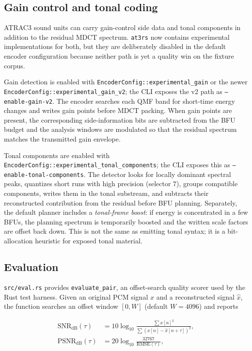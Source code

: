 \documentclass[11pt]{article}
\begin{document}
\subsection{Gain control and tonal coding}

ATRAC3 sound units can carry gain-control side data and tonal components in
addition to the residual MDCT spectrum. \texttt{at3rs} now contains
experimental implementations for both, but they are deliberately disabled in
the default encoder configuration because neither path is yet a quality win
on the fixture corpus.

Gain detection is enabled with \texttt{EncoderConfig::experimental\_gain} or the
newer \texttt{EncoderConfig::experimental\_gain\_v2}; the CLI exposes the v2
path as \texttt{--enable-gain-v2}. The encoder searches each QMF
band for short-time energy changes and writes gain points before MDCT
packing. When gain points are present, the corresponding side-information
bits are subtracted from the BFU budget and the analysis windows are modulated
so that the residual spectrum matches the transmitted gain envelope.

Tonal components are enabled with
\texttt{EncoderConfig::experimental\_tonal\_components}; the CLI exposes this
as \texttt{--enable-tonal-components}. The detector looks for
locally dominant spectral peaks, quantizes short runs with high precision
(selector \(7\)), groups compatible components, writes them in the tonal
substream, and subtracts their reconstructed contribution from the residual
before BFU planning. Separately, the default planner includes a
\emph{tonal-frame boost}: if energy is concentrated in a few BFUs, the
planning spectrum is temporarily boosted and the written scale factors are
offset back down. This is not the same as emitting tonal syntax; it is a
bit-allocation heuristic for exposed tonal material.

\subsection{Evaluation}

\texttt{src/eval.rs} provides \texttt{evaluate\_pair}, an offset-search
quality scorer used by the Rust test harness. Given an original PCM signal
\(x\) and a reconstructed signal \(\hat x\), the function searches an
offset window \([0, W]\) (default \(W = 4096\)) and reports

\begin{align}
\text{SNR}_\text{dB}(\tau) &= 10\log_{10}\!\frac{\sum x[n]^2}{\sum (x[n] - \hat x[n+\tau])^2}, \\
\text{PSNR}_\text{dB}(\tau) &= 20\log_{10}\!\frac{32767}{\text{RMSE}(\tau)},
\end{align}
\end{document}
